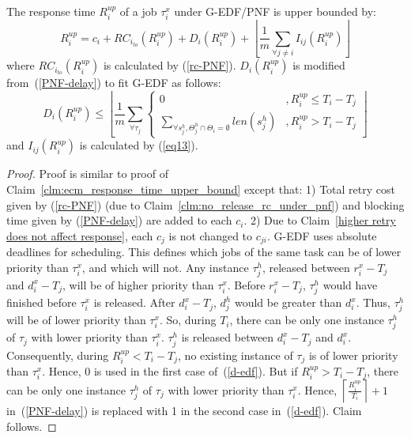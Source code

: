 %
\begin{clm}\label{response time ecm PNF}
%
The response time $R_i^{up}$ of a job $\tau_{i}^{x}$ under G-EDF/PNF is upper bounded by:
\begin{equation}
R_{i}^{up}=c_{i}+RC_{i_{to}}(R_i^{up})+D_i(R_i^{up})+\left\lfloor \frac{1}{m}\sum_{\forall j\ne i}I_{ij}(R_{i}^{up})\right\rfloor 
\end{equation}
where $RC_{i_{to}}(R_i^{up})$ is calculated by (\ref{rc-PNF}). $D_i(R_i^{up})$
is modified from~(\ref{PNF-delay}) to fit G-EDF as follows:
\begin{equation}
D_i(R_i^{up})\le \left\lfloor \frac{1}{m}\sum_{\forall \tau_{j}}\begin{cases}
0 & ,R_i^{up} \le T_{i}-T_{j}\\
\sum_{\forall s_{j}^{h}, \Theta_j^h \cap \Theta_i = \emptyset}len\left(s_{j}^{h}\right) & ,R_i^{up} >T_{i}-T_{j}
\end{cases}\right\rfloor
\label{d-edf}
\end{equation}
and $I_{ij}(R_{i}^{up})$ is calculated by (\ref{eq13}).
\end{clm}
%
\begin{proof}\normalfont
Proof is similar to proof of Claim~\ref{clm:ecm_response_time_upper_bound} except that: 1) Total retry cost given by (\ref{rc-PNF}) (due to Claim~\ref{clm:no_release_rc_under_pnf}) and blocking time given by (\ref{PNF-delay}) are added to each $c_i$. 2) Due to Claim~\ref{higher retry does not affect response}, each $c_j$ is not changed to $c_{ji}$. G-EDF uses absolute deadlines for scheduling. This defines which jobs of the same task can be of lower priority than $\tau_{i}^{x}$, and which will not. Any instance $\tau_j^h$, released between $r_i^x - T_j$ and $d_i^x - T_j$, will be of higher priority than $\tau_i^x$. Before $r_i^x-T_j$, $\tau_j^h$ would have finished before $\tau_i^x$ is released. After $d_i^x-T_j$, $d_j^h$ would be greater than $d_i^x$. Thus, $\tau_j^h$ will be of lower priority than $\tau_i^x$. So, during $T_i$, there can be only one instance $\tau_j^h$ of $\tau_j$ with lower priority than $\tau_i^x$. $\tau_j^h$ is released between $d_i^x-T_j$ and $d_i^x$. Consequently, during $R_i^{up}<T_i-T_j$, no existing instance of $\tau_j$ is of lower  priority than $\tau_i^x$. Hence, 0 is used in the first case of~(\ref{d-edf}). But if $R_i^{up}>T_i-T_j$, there can be only one instance $\tau_j^h$ of $\tau_j$ with lower priority than $\tau_i^x$. Hence, $\left\lceil\frac{R_i^{up}}{T_i}\right\rceil+1$ in~(\ref{PNF-delay}) is replaced with 1 in the second case in~(\ref{d-edf}). Claim follows.
\end{proof}
